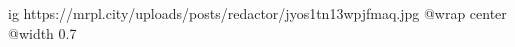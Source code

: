  
 
 
 
 

\ifcmt
  ig https://mrpl.city/uploads/posts/redactor/jyos1tn13wpjfmaq.jpg
  @wrap center
  @width 0.7
\fi
